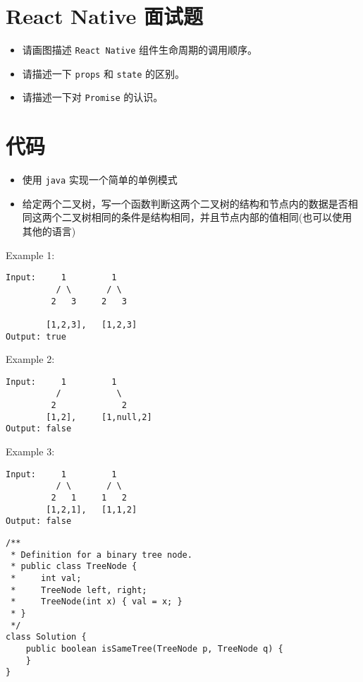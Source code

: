 \documentclass[11pt]{article}
\begin{document}
\section{React Native 面试题}
\label{sec:orgc65f848}
\begin{itemize}
\item 请画图描述 \texttt{React Native} 组件生命周期的调用顺序。
\item 请描述一下 \texttt{props} 和 \texttt{state} 的区别。
\item 请描述一下对 \texttt{Promise} 的认识。
\end{itemize}

\section{代码}
\label{sec:orgfcc0e6b}
\begin{itemize}
\item 使用 \texttt{java} 实现一个简单的单例模式
\item 给定两个二叉树，写一个函数判断这两个二叉树的结构和节点内的数据是否相同这两个二叉树相同的条件是结构相同，并且节点内部的值相同(也可以使用其他的语言)
\end{itemize}
Example 1:
\begin{verbatim}
Input:     1         1
          / \       / \
         2   3     2   3

        [1,2,3],   [1,2,3]
Output: true
\end{verbatim}
Example 2:
\begin{verbatim}
Input:     1         1
          /           \
         2             2
        [1,2],     [1,null,2]
Output: false
\end{verbatim}

Example 3:
\begin{verbatim}
Input:     1         1
          / \       / \
         2   1     1   2
        [1,2,1],   [1,1,2]
Output: false
\end{verbatim}
\begin{verbatim}
/**
 * Definition for a binary tree node.
 * public class TreeNode {
 *     int val;
 *     TreeNode left, right;
 *     TreeNode(int x) { val = x; }
 * }
 */
class Solution {
    public boolean isSameTree(TreeNode p, TreeNode q) {
    }
}
\end{verbatim}
\end{document}
